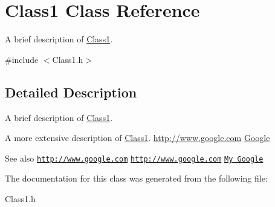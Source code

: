 \hypertarget{classClass1}{
\section{Class1 Class Reference}
\label{classClass1}
}


A brief description of \hyperlink{classClass1}{Class1}.  




{\ttfamily \#include $<$Class1.h$>$}



\subsection{Detailed Description}
A brief description of \hyperlink{classClass1}{Class1}. 

A more extensive description of \hyperlink{classClass1}{Class1}. \hyperlink{}{http://www.google.com} \hyperlink{}{Google } \begin{DoxySeeAlso}{See also}
\href{http://www.google.com}{\tt http://www.google.com} \href{http://www.google.com}{\tt http://www.google.com} \href{http://www.google.com}{\tt My Google} 
\end{DoxySeeAlso}


The documentation for this class was generated from the following file:\begin{DoxyCompactItemize}
\item 
Class1.h\end{DoxyCompactItemize}
